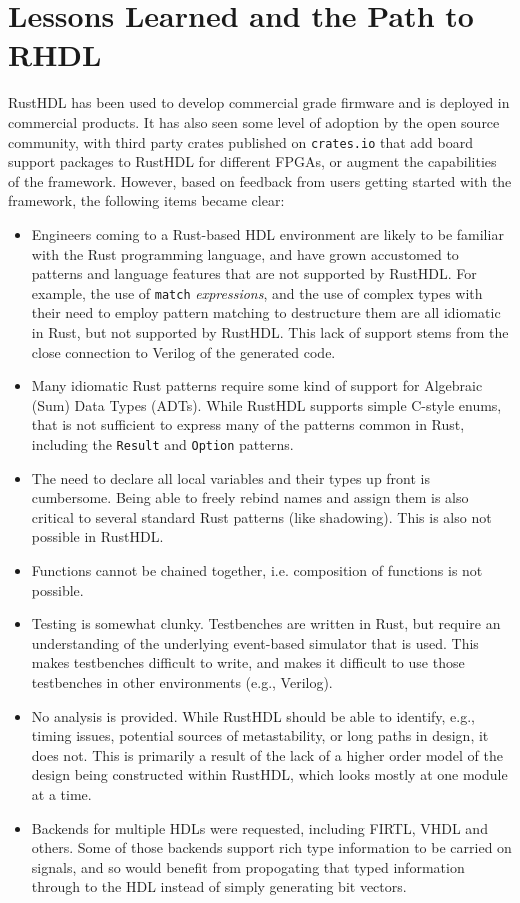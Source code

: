\documentclass[conference]{IEEEtran}
\begin{document}
\section{Lessons Learned and the Path to RHDL}

RustHDL has been used to develop commercial grade firmware and is deployed in commercial products.  It has also seen 
some level of adoption by the open source community, with third party crates published on \verb|crates.io| that add board
support packages to RustHDL for different FPGAs, or augment the capabilities of the framework.  However, based on
feedback from users getting started with the framework, the following items became clear:

\begin{itemize}
  \item Engineers coming to a Rust-based HDL environment are likely to be familiar with the Rust programming language,
  and have grown accustomed to patterns and language features that are not supported by RustHDL.  For example, the 
  use of \verb|match| \emph{expressions}, and the use of complex types with their need to employ pattern matching to destructure 
  them are all idiomatic in Rust, but not supported by RustHDL.  This 
  lack of support stems from the close connection to Verilog of the generated code.
  \item Many idiomatic Rust patterns require some kind of support for Algebraic (Sum) Data Types (ADTs).  While RustHDL
  supports simple C-style enums, that is not sufficient to express many of the patterns common in Rust, including the 
  \verb|Result| and \verb|Option| patterns.
  \item The need to declare all local variables and their types up front is cumbersome.  Being able to freely rebind
  names and assign them is also critical to several standard Rust patterns (like shadowing).  This is also not
  possible in RustHDL.
  \item Functions cannot be chained together, i.e. composition of functions is not possible.
  \item Testing is somewhat clunky.  Testbenches are written in Rust, but require an understanding of the underlying
  event-based simulator that is used.  This makes testbenches difficult to write, and makes it difficult to use those
  testbenches in other environments (e.g., Verilog).
  \item No analysis is provided.  While RustHDL should be able to identify, e.g., timing issues, potential sources of
  metastability, or long paths in design, it does not.  This is primarily a result of the lack of a higher order model
  of the design being constructed within RustHDL, which looks mostly at one module at a time.
  \item Backends for multiple HDLs were requested, including FIRTL, VHDL and others.  Some of those backends support
  rich type information to be carried on signals, and so would benefit from propogating that typed information through
  to the HDL instead of simply generating bit vectors.
\end{itemize}
\end{document}

